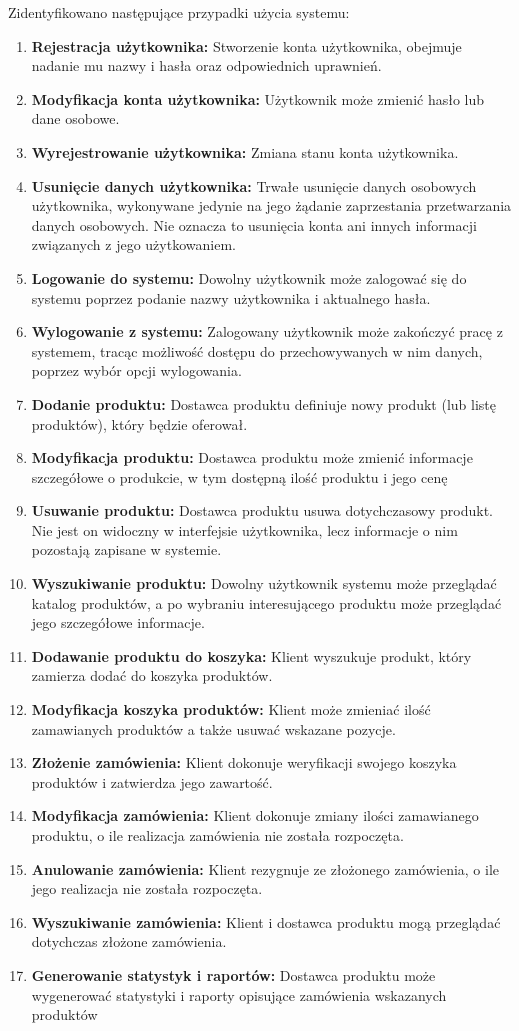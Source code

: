 \documentclass[11pt,a4paper,twoside]{article}
\begin{document}
\vspace*{1\baselineskip}
Zidentyfikowano następujące przypadki użycia systemu:
\begin{enumerate}[start=1,label={PU\arabic*.}]
\item \textbf{Rejestracja użytkownika:} Stworzenie konta użytkownika, obejmuje nadanie mu nazwy i hasła oraz odpowiednich uprawnień.
\item \textbf{Modyfikacja konta użytkownika:} Użytkownik może zmienić hasło lub dane osobowe.
\item \textbf{Wyrejestrowanie użytkownika:} Zmiana stanu konta użytkownika.
\item \textbf{Usunięcie danych użytkownika:} Trwałe usunięcie danych osobowych użytkownika, wykonywane jedynie na jego żądanie zaprzestania przetwarzania danych osobowych. Nie oznacza to usunięcia konta ani innych informacji związanych z jego użytkowaniem.
\item \textbf{Logowanie do systemu:} Dowolny użytkownik może zalogować się do systemu poprzez podanie nazwy użytkownika i aktualnego hasła.
\item \textbf{Wylogowanie z systemu:} Zalogowany użytkownik może zakończyć pracę z systemem, tracąc możliwość dostępu do przechowywanych w nim danych, poprzez wybór opcji wylogowania.
\item \textbf{Dodanie produktu:} Dostawca produktu definiuje nowy produkt (lub listę produktów), który będzie oferował. 
\item \textbf{Modyfikacja produktu:} Dostawca produktu może zmienić informacje szczegółowe o produkcie, w tym dostępną ilość produktu i jego cenę
\item \textbf{Usuwanie produktu:} Dostawca produktu usuwa dotychczasowy produkt. Nie jest on widoczny w interfejsie użytkownika, lecz informacje o nim pozostają zapisane w systemie.
\item \textbf{Wyszukiwanie produktu:} Dowolny użytkownik systemu może przeglądać katalog produktów, a po wybraniu interesującego produktu może przeglądać jego szczegółowe informacje.
\item \textbf{Dodawanie produktu do koszyka:} Klient wyszukuje produkt, który zamierza dodać do koszyka produktów. 
\item \textbf{Modyfikacja koszyka produktów:} Klient może zmieniać ilość zamawianych produktów a także usuwać wskazane pozycje.
\item \textbf{Złożenie zamówienia:} Klient dokonuje weryfikacji swojego koszyka produktów i zatwierdza jego zawartość.
\item \textbf{Modyfikacja zamówienia:} Klient dokonuje zmiany ilości zamawianego produktu, o ile realizacja zamówienia nie została rozpoczęta.
\item \textbf{Anulowanie zamówienia:} Klient rezygnuje ze złożonego zamówienia, o ile jego realizacja nie została rozpoczęta.
\item \textbf{Wyszukiwanie zamówienia:} Klient i dostawca produktu mogą przeglądać dotychczas złożone zamówienia.
\item \textbf{Generowanie statystyk i raportów:} Dostawca produktu może wygenerować statystyki i raporty opisujące zamówienia wskazanych produktów
\end{enumerate}
\end{document}
